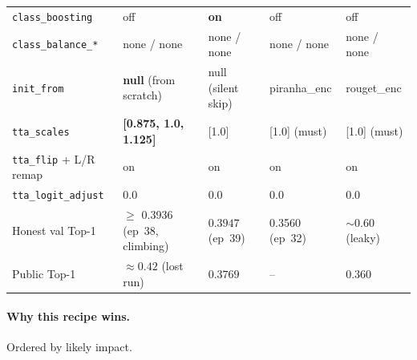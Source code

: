 \begin{table}[ht]
{\begin{tabular}{@{}l l l l l@{}}
\texttt{class\_boosting}  & off             & \textbf{on}             & off              & off \\
\texttt{class\_balance\_*}& none / none     & none / none             & none / none      & none / none \\
\texttt{init\_from}       & \textbf{null} (from scratch) & null (silent skip) & piranha\_enc & rouget\_enc \\
\texttt{tta\_scales}      & \textbf{[0.875, 1.0, 1.125]} & [1.0]      & [1.0] (must)     & [1.0] (must) \\
\texttt{tta\_flip} + L/R remap & on         & on                      & on               & on \\
\texttt{tta\_logit\_adjust}    & 0.0        & 0.0                     & 0.0              & 0.0 \\
\midrule
Honest val Top-1   & \(\ge\) 0.3936 (ep~38, climbing) & \(\mathbf{0.3947}\) (ep~39) & 0.3560 (ep~32) & \(\sim 0.60\) (leaky) \\
Public Top-1       & \(\approx 0.42\) (lost run) & \(\mathbf{0.3769}\) & --              & 0.360 \\
\bottomrule
\end{tabular}%
}
\end{table}

\paragraph{Why this recipe wins.}  Ordered by likely impact.

